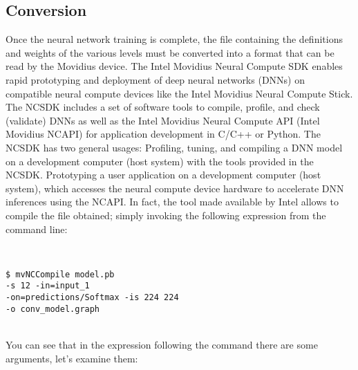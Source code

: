 \subsection{Conversion}
\label{subsection:conversion}
Once the neural network training is complete, the file containing the 
definitions and weights of the various levels must be converted into a format 
that can be read by the Movidius device.
The Intel Movidius Neural Compute SDK enables rapid prototyping and deployment 
of deep neural networks (DNNs) on compatible neural compute devices like the 
Intel Movidius Neural Compute Stick. 
The NCSDK includes a set of software tools to compile, profile, and check 
(validate) DNNs as well as the Intel Movidius Neural Compute API (Intel 
Movidius NCAPI) for application development in C/C++ or Python.
The NCSDK has two general usages:
Profiling, tuning, and compiling a DNN model on a development computer 
(host system) with the tools provided in the NCSDK.
Prototyping a user application on a development computer (host system), 
which accesses the neural compute device hardware to accelerate DNN inferences 
using the NCAPI. 
In fact, the tool made available by Intel allows to compile the file obtained; 
simply invoking the following expression from the command line:\\
{
\\
\begin{mycolorbox}[colback=light-gray]
\texttt{\$ mvNCCompile model.pb\\  -s 12 -in=input\_1 \\-on=predictions/Softmax -is 224 224 \\-o conv\_model.graph}
\end{mycolorbox}
}
\\You can see that in the expression following the command there are some 
arguments, let's examine them:
